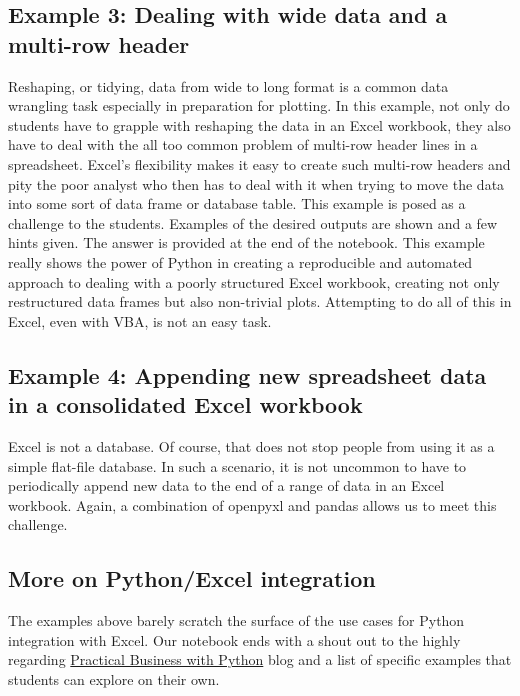 \documentclass[ited]{informs3}                      %
\begin{document}
\subsection{Example 3: Dealing with wide data and a multi-row header}

Reshaping, or tidying, data \citep{wickhamTidyData2014} from wide to long format is a common data wrangling task especially in preparation for plotting. In this example, not only do students have to grapple with reshaping the data in an Excel workbook, they also have to deal with the all too common problem of multi-row header lines in a spreadsheet. Excel's flexibility makes it easy to create such multi-row headers and pity the poor analyst who then has to deal with it when trying to move the data into some sort of data frame or database table. This example is posed as a challenge to the students. Examples of the desired outputs are shown and a few hints given. The answer is provided at the end of the notebook. This example really shows the power of Python in creating a reproducible and automated approach to dealing with a poorly structured Excel workbook, creating not only restructured data frames but also non-trivial plots. Attempting to do all of this in Excel, even with VBA, is not an easy task.

\subsection{Example 4: Appending new spreadsheet data in a consolidated Excel workbook}

Excel is not a database. Of course, that does not stop people from using it as a simple flat-file database. In such a scenario, it is not uncommon to have to periodically append new data to the end of a range of data in an Excel workbook. Again, a combination of openpyxl and pandas allows us to meet this challenge.

\subsection{More on Python/Excel integration}

The examples above barely scratch the surface of the use cases for Python integration with Excel. Our notebook ends with a shout out to the highly regarding \href{https://pbpython.com/}{Practical Business with Python} blog and a list of specific examples that students can explore on their own.
\end{document}
